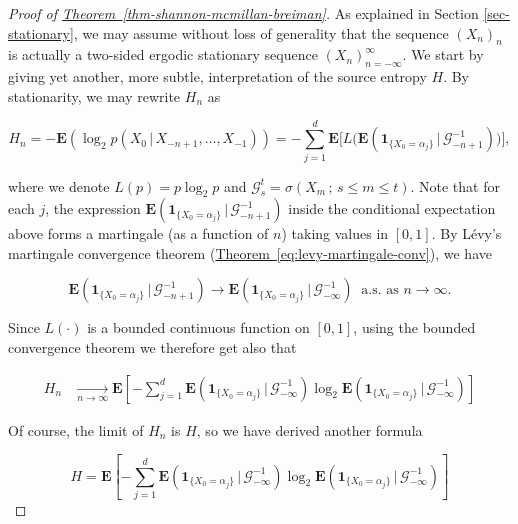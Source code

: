 \documentclass[11pt]{report}
\theoremstyle{plain}
\theoremstyle{definition}
\begin{document}
\begin{proof}[Proof of \texorpdfstring{\hyperref[thm-shannon-mcmillan-breiman]{Theorem~\ref*{thm-shannon-mcmillan-breiman}}}{Theorem}]
As explained in Section \ref{sec-stationary}, we may
assume without loss of generality that the sequence
$(X_n)_n$ is actually a two-sided ergodic stationary
sequence $(X_n)_{n=-\infty}^\infty$. We start by
giving yet another, more subtle, interpretation of the
source entropy $H$. By stationarity, we may rewrite
$H_n$ as

\[
H_n = -\mathbf{E}(\log_2 p(X_0\,|\,X_{-n+1},\ldots,X_{-1})) = -\sum_{j=1}^d \mathbf{E}\Big[ L\big(
\mathbf{E}\left(\mathbf{1}_{\{X_0=\alpha_j\}}\,|\,\mathcal{G}_{-n+1}^{-1}\right) \big)\Big],
\]

\noindent where we denote $L(p) = p\log_2 p$ and
$\mathcal{G}_s^t = \sigma(X_m\,;\, s\le m\le t)$.
Note that for each $j$, the expression
$\mathbf{E}\left(\mathbf{1}_{\{X_0=\alpha_j\}}\,|\,\mathcal{G}_{-n+1}^{-1}\right)$
inside the conditional expectation above forms a
martingale (as a function of $n$) taking values in
$[0,1]$. By L\'evy's martingale convergence theorem
(\hyperref[eq:levy-martingale-conv]{Theorem~\ref*{eq:levy-martingale-conv}}), we have

\[
\mathbf{E}\left(\mathbf{1}_{\{X_0=\alpha_j\}}\,|\,\mathcal{G}_{-n+1}^{-1}\right) \to \mathbf{E}\left(\mathbf{1}_{\{X_0=\alpha_j\}}\,|\,\mathcal{G}_{-\infty}^{-1}\right) \ \textrm{ a.s. as }n\to\infty.
\]

\noindent Since $L(\cdot)$ is a bounded continuous function on
$[0,1]$, using the bounded convergence theorem we
therefore get also that

\begin{align*}
H_n
&\xrightarrow[n\to\infty]{} \mathbf{E}\left[ -\sum_{j=1}^d \mathbf{E}\left(\mathbf{1}_{\{X_0=\alpha_j\}}\,|\,\mathcal{G}_{-\infty}^{-1}\right)
\log_2 \mathbf{E}\left(\mathbf{1}_{\{X_0=\alpha_j\}}\,|\,\mathcal{G}_{-\infty}^{-1}\right)
\right]
\end{align*}

\noindent Of course, the limit of $H_n$ is $H$, so we have
derived another formula

\begin{equation*} \tag{35}\label{eq:entropy-newformula}
H = \mathbf{E}\left[ -\sum_{j=1}^d \mathbf{E}\left(\mathbf{1}_{\{X_0=\alpha_j\}}\,|\,\mathcal{G}_{-\infty}^{-1}\right)
\log_2 \mathbf{E}\left(\mathbf{1}_{\{X_0=\alpha_j\}}\,|\,\mathcal{G}_{-\infty}^{-1}\right)
\right]
\end{equation*}


\end{proof}
\end{document}
